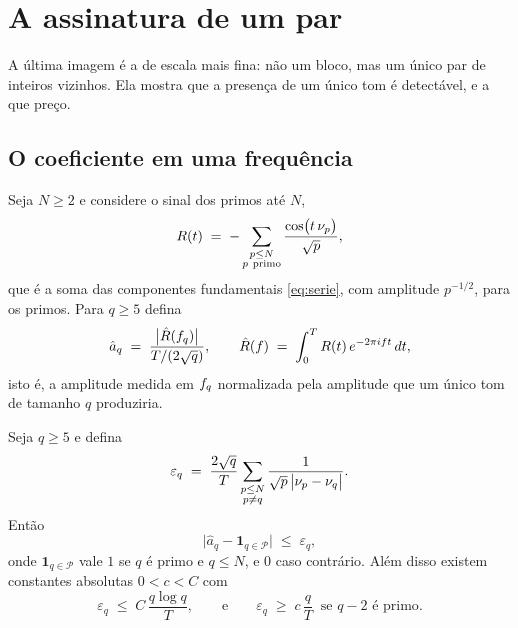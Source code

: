 \section{A assinatura de um par}\label{sec:assinatura}

A última imagem é a de escala mais fina: não um bloco, mas um único par de
inteiros vizinhos. Ela mostra que a presença de um único tom é detectável, e a
que preço.

\subsection{O coeficiente em uma frequência}

Seja $N\ge2$ e considere o sinal dos primos até $N$,
\begin{equation}\label{eq:Rprimo}
  R(t) \;=\; -\sum_{\substack{p\le N\\ p\ \mathrm{primo}}}
  \frac{\cos\bigl(t\,\nu_{p}\bigr)}{\sqrt p},
\end{equation}
que é a soma das componentes fundamentais \eqref{eq:serie}, com amplitude
$p^{-1/2}$, para os primos. Para $q\ge5$ defina
\[
  \hat a_q \;=\;
  \frac{\bigl|\hat R(f_{q})\bigr|}{T/(2\sqrt q)},
  \qquad
  \hat R(f) \;=\; \int_0^T R(t)\,e^{-2\pi i f t}\,dt ,
\]
isto é, a amplitude medida em $f_{q}$ normalizada pela amplitude que um único
tom de tamanho $q$ produziria.

\begin{proposicao}\label{prop:gemeo}
Seja $q\ge5$ e defina
\[
  \varepsilon_q \;=\;
  \frac{2\sqrt q}{T}\sum_{\substack{p\le N\\ p\neq q}}
  \frac{1}{\sqrt p\,\bigl|\nu_{p}-\nu_{q}\bigr|}.
\]
Então
\[
  \bigl|\hat a_q - \mathbf 1_{q\in\mathcal P}\bigr| \;\le\; \varepsilon_q ,
\]
onde $\mathbf 1_{q\in\mathcal P}$ vale $1$ se $q$ é primo e $q\le N$, e $0$ caso
contrário. Além disso existem constantes absolutas $0<c<C$ com
\[
  \varepsilon_q \;\le\; C\,\frac{q\log q}{T},
  \qquad\text{e}\qquad
  \varepsilon_q \;\ge\; c\,\frac{q}{T}
  \ \text{ se } q-2 \text{ é primo}.
\]
\end{proposicao}

